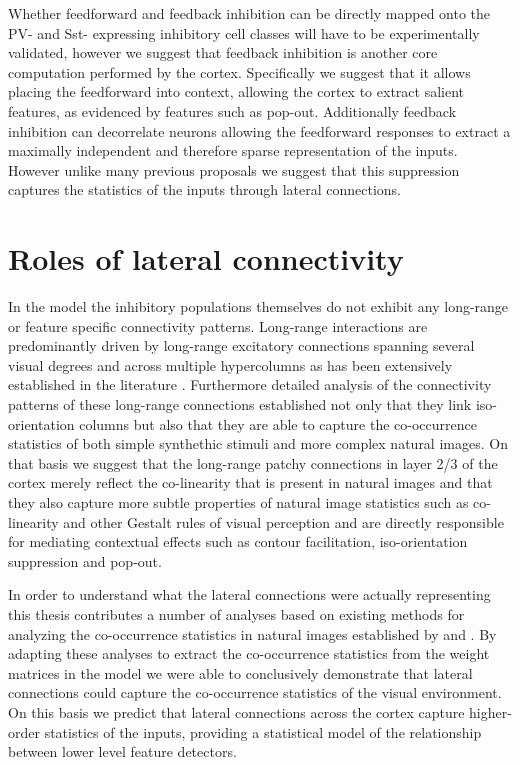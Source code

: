 Whether feedforward and feedback inhibition can be directly mapped
onto the PV- and Sst- expressing inhibitory cell classes will have to
be experimentally validated, however we suggest that feedback
inhibition is another core computation performed by the
cortex. Specifically we suggest that it allows placing the feedforward
into context, allowing the cortex to extract salient features, as
evidenced by features such as pop-out. Additionally feedback
inhibition can decorrelate neurons allowing the feedforward responses
to extract a maximally independent and therefore sparse representation
of the inputs. However unlike many previous proposals we suggest that
this suppression captures the statistics of the inputs through lateral
connections.

\section{Roles of lateral connectivity}

In the model the inhibitory populations themselves do not exhibit any
long-range or feature specific connectivity patterns. Long-range
interactions are predominantly driven by long-range excitatory
connections spanning several visual degrees and across multiple
hypercolumns as has been extensively established in the literature
\citep{Weliky1995, Bair2003}. Furthermore detailed analysis of the
connectivity patterns of these long-range connections established not
only that they link iso-orientation columns but also that they are
able to capture the co-occurrence statistics of both simple synthethic
stimuli and more complex natural images. On that basis we suggest that
the long-range patchy connections in layer 2/3 of the cortex merely
reflect the co-linearity that is present in natural images and that
they also capture more subtle properties of natural image statistics
such as co-linearity and other Gestalt rules of visual perception and
are directly responsible for mediating contextual effects such as
contour facilitation, iso-orientation suppression and pop-out.

In order to understand what the lateral connections were actually
representing this thesis contributes a number of analyses based on
existing methods for analyzing the co-occurrence statistics in natural
images established by \cite{Geisler2001} and \cite{Perrinet2015}. By
adapting these analyses to extract the co-occurrence statistics from
the weight matrices in the model we were able to conclusively
demonstrate that lateral connections could capture the co-occurrence
statistics of the visual environment. On this basis we predict that
lateral connections across the cortex capture higher-order statistics
of the inputs, providing a statistical model of the relationship
between lower level feature detectors.

